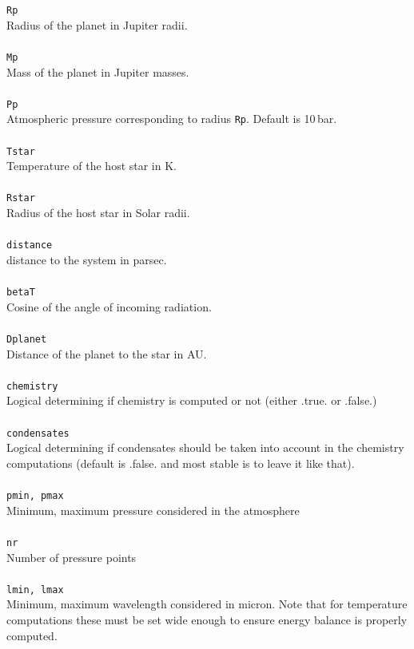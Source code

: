 \documentclass[12pt]{article}
\begin{document}
\texttt{Rp}\\
Radius of the planet in Jupiter radii.
\\ \\
\texttt{Mp}\\
Mass of the planet in Jupiter masses.
\\ \\
\texttt{Pp}\\
Atmospheric pressure corresponding to radius \texttt{Rp}. Default is 10\,bar.
\\ \\
\texttt{Tstar}\\
Temperature of the host star in K.
\\ \\
\texttt{Rstar}\\
Radius of the host star in Solar radii.
\\ \\
\texttt{distance}\\
distance to the system in parsec.
\\ \\
\texttt{betaT}\\
Cosine of the angle of incoming radiation.
\\ \\
\texttt{Dplanet}\\
Distance of the planet to the star in AU.
\\ \\
\texttt{chemistry}\\
Logical determining if chemistry is computed or not (either .true. or .false.)
\\ \\
\texttt{condensates}\\
Logical determining if condensates should be taken into account in the chemistry computations (default is .false. and most stable is to leave it like that).
\\ \\
\texttt{pmin, pmax}\\
Minimum, maximum pressure considered in the atmosphere
\\ \\
\texttt{nr}\\
Number of pressure points
\\ \\
\texttt{lmin, lmax}\\
Minimum, maximum wavelength considered in micron. Note that for temperature computations these must be set wide enough to ensure energy balance is properly computed.
\end{document}
